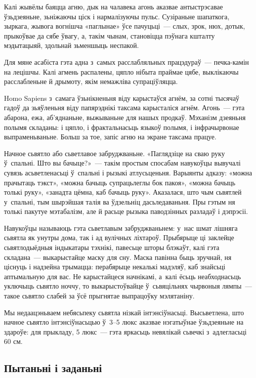 Калі жывёлы баяцца агню, дык на чалавека агонь аказвае антыстрэсавае ўзьдзеяньне, зьніжаючы ціск і нармалізуючы пульс. Сузіраньне шапаткога, зыркага, жывога вогнішча «паглынае» ўсе пачуцьці~--- слых, зрок, нюх, дотык, прыкоўвае да сябе ўвагу, а, такім чынам, становіцца пэўнага кшталту мэдытацыяй, здольнай зьменшыць неспакой.

Для мяне асабіста гэта адна з~самых расслабляльных працэдураў~--- печка-камін на лецішчы. Калі агмень распалены, цяпло нібыта праймае цябе, выклікаючы расслабленьне й дрымоту, якім немажліва супраціўляцца.

Homo Sapiens з~самага ўзьнікненьня віду карыстаўся агнём, за сотні тысячаў гадоў да зьяўленьня віду папярэднікі таксама карысталіся агнём. Агонь~--- гэта абарона, ежа, аб'яднаньне, выжываньне для нашых продкаў. Мэханізм дзеяньня полымя складаны: і цяпло, і фрактальнасьць языкоў полымя, і інфрачырвонае выпраменьваньне. Больш за тое, запіс агню на экране таксама працуе.

Начное сьвятло або сьветлавое забруджваньне. «Паглядзіце на сваю руку ў~спальні. Што вы бачыце?»~--- такім простым спосабам навукоўцы вывучалі сувязь асьветленасьці ў~спальні і рызыкі атлусьценьня. Варыянты адказу: «можна прачытаць тэкст», «можна бачыць супрацьлеглы бок пакоя», «можна бачыць толькі руку», «занадта цёмна, каб бачыць руку». Аказалася, што чым сьвятлей у~спальні, тым шырэйшая талія ва ўдзельніц дасьледаваньня. Пры гэтым ня толькі пакутуе мэтабалізм, але й расьце рызыка паводзінных разладаў і дэпрэсіі.

Навукоўцы называюць гэта сьветлавым забруджваньнем: у~нас шмат лішняга сьвятла як унутры дома, так і ад вулічных ліхтароў. Прыбярыце ці заклейце сьвятлодыёдныя індыкатары тэхнікі, павесьце шторы блэкаўт, калі гэта складана~--- выкарыстайце маску для сну. Маска павінна быць зручнай, ня ціснуць і надзейна трымацца: перабярыце некалькі мадэляў, каб знайсьці аптымальную для вас. Не карыстайцеся начнікамі, а~калі ёсьць неабходнасьць уключыць сьвятло ноччу, то выкарыстоўвайце ў~сьвяцільнях чырвоныя лямпы~--- такое сьвятло слабей за ўсё прыгнятае выпрацоўку мэлятаніну.

Мы недаацэньваем небясьпеку сьвятла нізкай інтэнсіўнасьці. Высьветлена, што начное сьвятло інтэнсіўнасьцью ў~3--5 люкс аказвае нэгатыўнае ўзьдзеяньне на здароўе: для прыкладу, 5 люкс~--- гэта яркасьць невялікай сьвечкі з~адлегласьці 60 см.

\subsection*{Пытаньні і заданьні}

